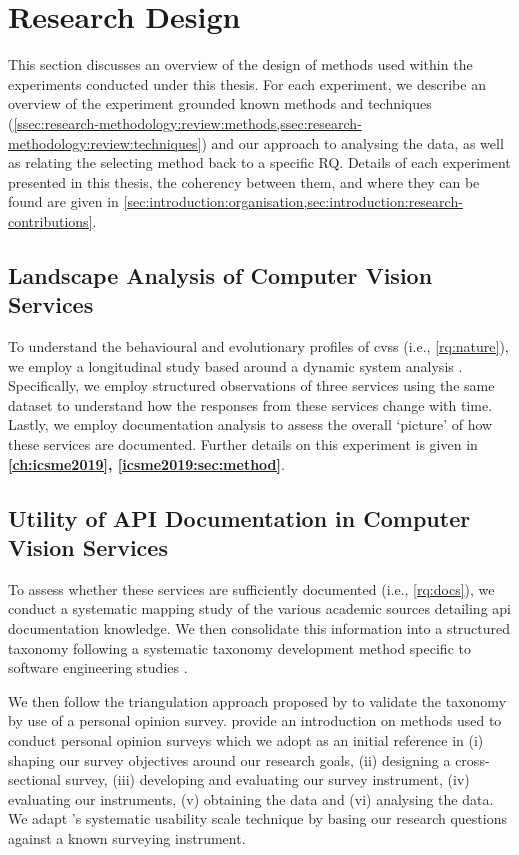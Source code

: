 \section{Research Design}
\label{sec:research-methodology:experiments}

This section discusses an overview of the design of methods used within the experiments conducted under this thesis. For each experiment, we describe an overview of the experiment grounded known methods and techniques (\cref{ssec:research-methodology:review:methods,ssec:research-methodology:review:techniques}) and our approach to analysing the data, as well as relating the selecting method back to a specific RQ. Details of each experiment presented in this thesis, the coherency between them, and where they can be found are given in \cref{sec:introduction:organisation,sec:introduction:research-contributions}.

\subsection{Landscape Analysis of Computer Vision Services}

To understand the behavioural and evolutionary profiles of \glspl{cvs} (i.e., \ref{rq:nature}), we employ a longitudinal study based around a dynamic system analysis \citep{Singer:2007tu}. Specifically, we employ structured observations of three services using the same dataset to understand how the responses from these services change with time. Lastly, we employ documentation analysis to assess the overall `picture' of how these services are documented. Further details on this experiment is given in \textbf{\cref{ch:icsme2019}, \cref{icsme2019:sec:method}}.

\subsection{Utility of API Documentation in Computer Vision Services}

To assess whether these services are sufficiently documented (i.e., \ref{rq:docs}), we conduct a systematic mapping study \citep{Kitchenham:2007dd,Petersen:2008td} of the various academic sources detailing \gls{api} documentation knowledge. We then consolidate this information into a structured taxonomy following a systematic taxonomy development method specific to software engineering studies \citep{Usman:2017hn}.

We then follow the triangulation approach proposed by \citet{Jick:1979el} to validate the taxonomy by use of a personal opinion survey. \citet{Kitchenham:2007ux} provide an introduction on methods used to conduct personal opinion surveys which we adopt as an initial reference in (i) shaping our survey objectives around our research goals, (ii) designing a cross-sectional survey, (iii) developing and evaluating our survey instrument, (iv) evaluating our instruments, (v) obtaining the data and (vi) analysing the data. We adapt \citeauthor{Brooke:1996ua}'s systematic usability scale \citep{Brooke:1996ua} technique by basing our research questions against a known surveying instrument.

